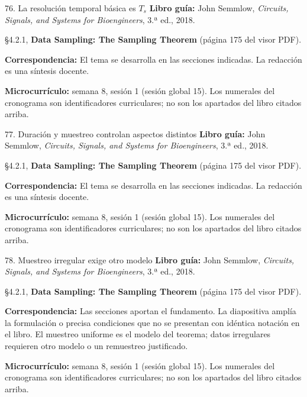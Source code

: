 \documentclass[
  10pt,
  ignorenonframetext,
  aspectratio=169,
  spanish,
]{beamer}
\begin{document}
\begin{frame}{76. La resolución temporal básica es \(T_s\)}
\label{la-resoluciuxf3n-temporal-buxe1sica-es-t_s}
\textbf{Libro guía:} John Semmlow, \emph{Circuits, Signals, and Systems
for Bioengineers}, 3.ª ed., 2018.

§4.2.1, \textbf{Data Sampling: The Sampling Theorem} (página 175 del
visor PDF).

\textbf{Correspondencia:} El tema se desarrolla en las secciones
indicadas. La redacción es una síntesis docente.

\textbf{Microcurrículo:} semana 8, sesión 1 (sesión global 15). Los
numerales del cronograma son identificadores curriculares; no son los
apartados del libro citados arriba.
\end{frame}

\begin{frame}{77. Duración y muestreo controlan aspectos distintos}
\label{duraciuxf3n-y-muestreo-controlan-aspectos-distintos}
\textbf{Libro guía:} John Semmlow, \emph{Circuits, Signals, and Systems
for Bioengineers}, 3.ª ed., 2018.

§4.2.1, \textbf{Data Sampling: The Sampling Theorem} (página 175 del
visor PDF).

\textbf{Correspondencia:} El tema se desarrolla en las secciones
indicadas. La redacción es una síntesis docente.

\textbf{Microcurrículo:} semana 8, sesión 1 (sesión global 15). Los
numerales del cronograma son identificadores curriculares; no son los
apartados del libro citados arriba.
\end{frame}

\begin{frame}{78. Muestreo irregular exige otro modelo}
\label{muestreo-irregular-exige-otro-modelo}
\textbf{Libro guía:} John Semmlow, \emph{Circuits, Signals, and Systems
for Bioengineers}, 3.ª ed., 2018.

§4.2.1, \textbf{Data Sampling: The Sampling Theorem} (página 175 del
visor PDF).

\textbf{Correspondencia:} Las secciones aportan el fundamento. La
diapositiva amplía la formulación o precisa condiciones que no se
presentan con idéntica notación en el libro. El muestreo uniforme es el
modelo del teorema; datos irregulares requieren otro modelo o un
remuestreo justificado.

\textbf{Microcurrículo:} semana 8, sesión 1 (sesión global 15). Los
numerales del cronograma son identificadores curriculares; no son los
apartados del libro citados arriba.
\end{frame}
\end{document}
